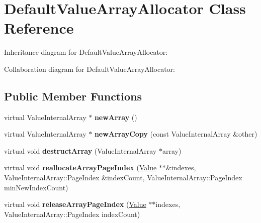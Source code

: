 \hypertarget{class_default_value_array_allocator}{\section{Default\+Value\+Array\+Allocator Class Reference}
\label{class_default_value_array_allocator}
}


Inheritance diagram for Default\+Value\+Array\+Allocator\+:


Collaboration diagram for Default\+Value\+Array\+Allocator\+:
\subsection*{Public Member Functions}
\begin{DoxyCompactItemize}
\item 
\hypertarget{class_default_value_array_allocator_a8689ed26ea893863259338c15d838b41}{virtual Value\+Internal\+Array $\ast$ {\bfseries new\+Array} ()}\label{class_default_value_array_allocator_a8689ed26ea893863259338c15d838b41}

\item 
\hypertarget{class_default_value_array_allocator_a2d56726cd560f97c3589026be8a65d95}{virtual Value\+Internal\+Array $\ast$ {\bfseries new\+Array\+Copy} (const Value\+Internal\+Array \&other)}\label{class_default_value_array_allocator_a2d56726cd560f97c3589026be8a65d95}

\item 
\hypertarget{class_default_value_array_allocator_adac32a54d25ee1aee7df3b19527ffb57}{virtual void {\bfseries destruct\+Array} (Value\+Internal\+Array $\ast$array)}\label{class_default_value_array_allocator_adac32a54d25ee1aee7df3b19527ffb57}

\item 
\hypertarget{class_default_value_array_allocator_a2a5376fbd5ac116ef985935e569d0492}{virtual void {\bfseries reallocate\+Array\+Page\+Index} (\hyperlink{union_value}{Value} $\ast$$\ast$\&indexes, Value\+Internal\+Array\+::\+Page\+Index \&index\+Count, Value\+Internal\+Array\+::\+Page\+Index min\+New\+Index\+Count)}\label{class_default_value_array_allocator_a2a5376fbd5ac116ef985935e569d0492}

\item 
\hypertarget{class_default_value_array_allocator_a315ffaf5d7d8ca65c10f9468814866f4}{virtual void {\bfseries release\+Array\+Page\+Index} (\hyperlink{union_value}{Value} $\ast$$\ast$indexes, Value\+Internal\+Array\+::\+Page\+Index index\+Count)}\label{class_default_value_array_allocator_a315ffaf5d7d8ca65c10f9468814866f4}


\end{DoxyCompactItemize}
